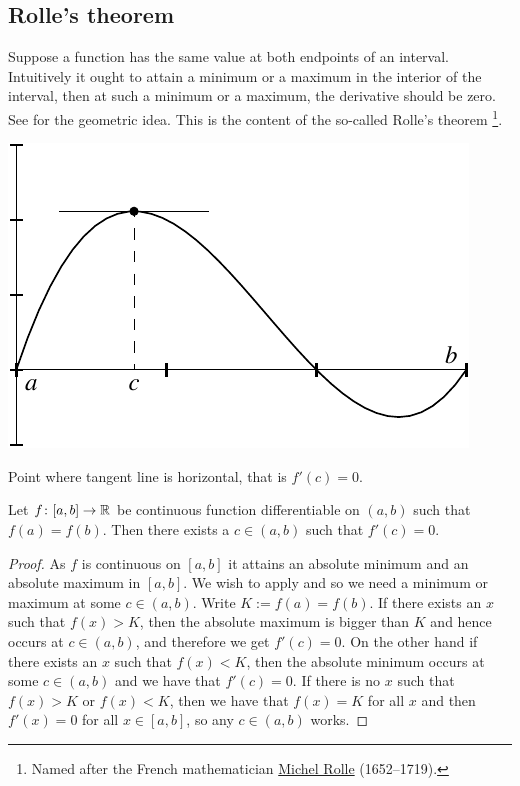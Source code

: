 \subsection{Rolle's theorem}

Suppose a function has the same value at both endpoints of an interval.
Intuitively it ought to attain a minimum or a maximum in the interior of the
interval,
then at such a minimum or a maximum, the derivative should be zero.
See  for the geometric idea.  This is the content of the
so-called Rolle's theorem%
\footnote{Named after the French mathematician
\href{https://en.wikipedia.org/wiki/Michel_Rolle}{Michel Rolle}
(1652--1719).}.

\begin{myfigureht}
\includegraphics{figures/rollefig}
\caption{Point where tangent line is horizontal, that is $f'(c) =
0$.\label{rollefig}}
\end{myfigureht}

\begin{thm}[Rolle] \label{thm:rolle}
Let $f \colon [a,b] \to {\mathbb{R}}$ be continuous function
differentiable on $(a,b)$ such that $f(a) = f(b)$.
Then there exists a $c \in (a,b)$ such that $f'(c) = 0$.
\end{thm}

\begin{proof}
As $f$ is continuous on $[a,b]$ it attains an absolute minimum and an
absolute 
maximum in $[a,b]$.  We wish to apply  and
so we need a minimum or maximum at some $c \in (a,b)$.
Write $K := f(a) = f(b)$.
If there exists an $x$ such that $f(x) > K$, then the absolute
maximum is bigger than $K$ and hence occurs at $c \in (a,b)$, and
therefore we get $f'(c) = 0$.  On the other hand if there exists an $x$
such that $f(x) < K$, then the absolute minimum occurs at some
$c \in (a,b)$ and we have that $f'(c) = 0$.  If there is no $x$ such that
$f(x) > K$ or
$f(x) < K$, then we have that $f(x) = K$ for all $x$ and then
$f'(x) = 0$ for all $x \in [a,b]$, so any $c \in (a,b)$ works.
\end{proof}

